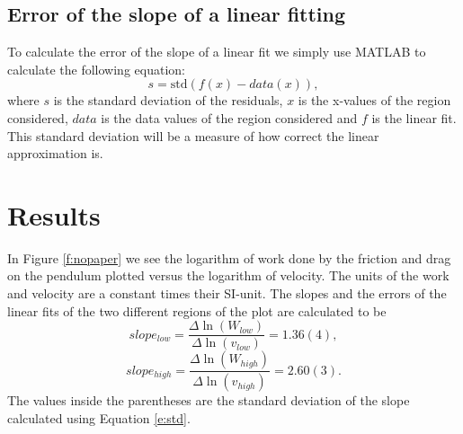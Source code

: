 \documentclass[11pt, a4paper]{article}
\begin{document}
\subsection{Error of the slope of a linear fitting}
To calculate the error of the slope of a linear fit we simply use MATLAB to calculate the following equation:
\begin{equation}
	s = \text{std}(f(x)-data(x)),
	\label{e:std}
\end{equation}
where $s$ is the standard deviation of the residuals, $x$ is the x-values of the region considered, $data$ is the data values of the region considered and $f$ is the linear fit.
This standard deviation will be a measure of how correct the linear approximation is.



\section{Results}
In Figure \ref{f:nopaper} we see the logarithm of work done by the friction and 
drag on the pendulum plotted versus the logarithm of velocity. 
The units of the work and velocity are a constant times their SI-unit. 
The slopes and the errors of the linear fits of the two different regions of the plot are calculated to be
\[
	slope_{low}=\frac{\Delta\ln(W_{low})}{\Delta\ln(v_{low})} = 1.36(4),
\]\[
	slope_{high}=\frac{\Delta\ln(W_{high})}{\Delta\ln(v_{high})} = 2.60(3).
\]
The values inside the parentheses are the standard deviation of the slope calculated using Equation \ref{e:std}.
\end{document}

